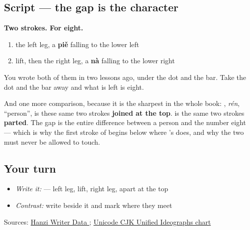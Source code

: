 \subsection*{Script — the gap is the character}

\begin{quote}
\end{quote}

\textbf{Two strokes. For eight.}

\begin{enumerate}
\raggedright
  \item the left leg, a \textbf{piě} falling to the lower left
  \item lift, then the right leg, a \textbf{nà} falling to the lower right
\end{enumerate}

You wrote both of them in  two lessons ago, under the dot and the bar. Take the dot and the bar away and what is left is eight.

And one more comparison, because it is the sharpest in the whole book: \textbf{}, \emph{rén}, \textquotedblleft{}person\textquotedblright{}, is these same two strokes \textbf{joined at the top}.  is the same two strokes \textbf{parted}. The gap is the entire difference between a person and the number eight — which is why the first stroke of  begins below where 's does, and why the two must never be allowed to touch.

\subsection*{Your turn}
\begin{itemize}
\raggedright
  \item \emph{Write it:}  — left leg, lift, right leg, apart at the top
  \item \emph{Contrast:} write  beside it and mark where they meet
\end{itemize}

\begin{tcolorbox}[breakable,colback=teal!4,colframe=teal!35!black,title={Before you move on}]
Sources: \href{https://raw.githubusercontent.com/chanind/hanzi-writer-data/68d10a4b21150cae5e1ebbd223eed289cf32d90c/data/\%E5\%85\%AB.json}{Hanzi Writer Data }; \href{https://www.unicode.org/charts/PDF/U4E00.pdf}{Unicode CJK Unified Ideographs chart}
\end{tcolorbox}
